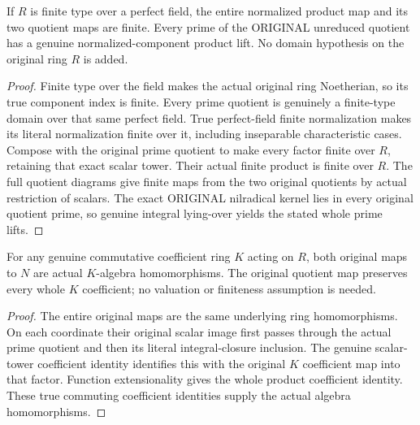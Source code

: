 \begin{theorem}
\label{algebra:finite-original-normalized-component-covers}
\leanok
{}
If $R$ is finite type over a perfect field, the entire normalized product
map and its two quotient maps are finite. Every prime of the ORIGINAL
unreduced quotient has a genuine normalized-component product lift.
No domain hypothesis on the original ring $R$ is added.
\end{theorem}
\begin{proof}
Finite type over the field makes the actual original ring Noetherian,
so its true component index is finite. Every prime quotient is genuinely
a finite-type domain over that same perfect field. True perfect-field
finite normalization makes its literal normalization finite over it,
including inseparable characteristic cases. Compose with the original
prime quotient to make every factor finite over $R$, retaining that
exact scalar tower. Their actual finite product is finite over $R$.
The full quotient diagrams give finite maps from the two original
quotients by actual restriction of scalars. The exact ORIGINAL nilradical
kernel lies in every original quotient prime, so genuine integral
lying-over yields the stated whole prime lifts.
\end{proof}

\begin{theorem}
\label{algebra:normalized-component-original-coefficients}
\leanok
{}
For any genuine commutative coefficient ring $K$ acting on $R$, both
original maps to $N$ are actual $K$-algebra homomorphisms. The original
quotient map preserves every whole $K$ coefficient; no valuation or
finiteness assumption is needed.
\end{theorem}
\begin{proof}
The entire original maps are the same underlying ring homomorphisms.
On each coordinate their original scalar image first passes through
the actual prime quotient and then its literal integral-closure inclusion.
The genuine scalar-tower coefficient identity identifies this with the
original $K$ coefficient map into that factor. Function extensionality
gives the whole product coefficient identity. These true commuting
coefficient identities supply the actual algebra homomorphisms.
\end{proof}

